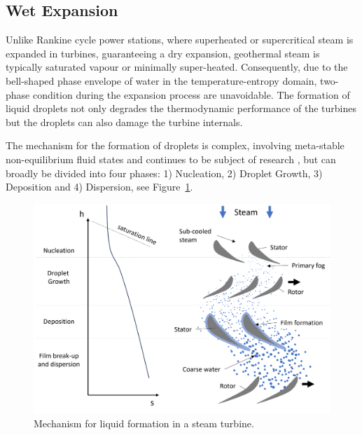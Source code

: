     \subsection{Wet Expansion}
        \label{sec:prosim_litrev_wet_expansion}
        Unlike Rankine cycle power stations, where superheated or supercritical steam is expanded in turbines, guaranteeing a dry expansion, geothermal steam is typically saturated vapour or minimally super-heated. Consequently, due to the bell-shaped phase envelope of water in the temperature-entropy domain, two-phase condition during the expansion process are unavoidable. The formation of liquid droplets not only degrades the thermodynamic performance of the turbines but the droplets can also damage the turbine internals.

        The mechanism for the formation of droplets is complex, involving meta-stable non-equilibrium fluid states and continues to be subject of research \cite{Senoo2017}, but can broadly be divided into four phases: 1) Nucleation, 2) Droplet Growth, 3) Deposition and 4) Dispersion, see Figure~\ref{fig:prosim_litrev_WetExpansion_mech}.
        
        \begin{figure}[H]
            \centering
            \includegraphics[width=.95\columnwidth]{Content/PowGen/Figures/Turbine/WetExpansionMechanism.png}
            \caption{Mechanism for liquid formation in a steam turbine.}
            \label{fig:prosim_litrev_WetExpansion_mech}
        \end{figure}

